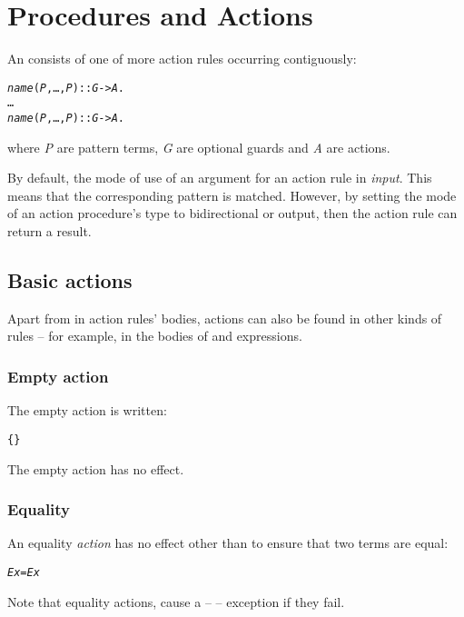\chapter{Procedures and Actions}
\label{actions}

An   consists of one of more action rules occurring contiguously:
\begin{alltt}
\emph{name}(\emph{P},\ldots,\emph{P\subn}) :: \emph{G} -> \emph{A}.
\ldots
\emph{name}(\emph{P},\ldots,\emph{P\subn}) :: \emph{G} -> \emph{A}.
\end{alltt}
where \emph{P} are pattern terms, \emph{G\subi} are optional guards  and \emph{A\subi} are actions.

By default, the mode of use of an argument for an action rule in \emph{input}. This means that the corresponding pattern is matched. However, by setting the mode of an action procedure's type to bidirectional or output, then the action rule can return a result.

\section{Basic actions}
\label{action:basic}
Apart from in action rules' bodies, actions can also be found in other kinds of rules -- for example, in the bodies of  and  expressions.

\subsection{Empty action}
\label{action:empty}

The empty action is written:
\begin{alltt}
\{\}
\end{alltt}
The empty action has no effect.

\subsection{Equality}
\label{action:equality}

An equality \emph{action} has no effect other than to ensure that two terms are equal:
\begin{alltt}
\emph{Ex} = \emph{Ex}
\end{alltt}
Note that equality actions, cause a --  --  exception if they fail.


